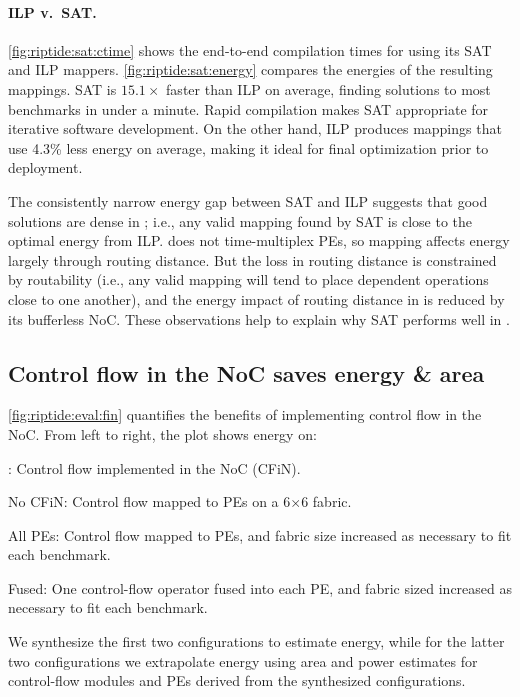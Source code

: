 \figRipTideSATResults
\paragraph{ILP v.\ SAT.}
\autoref{fig:riptide:sat:ctime} shows the end-to-end compilation times for \riptide using its SAT and ILP mappers.
% 
\autoref{fig:riptide:sat:energy} compares the energies of the resulting mappings.
% 
SAT is $15.1\times$ faster than ILP on average, finding solutions to most benchmarks in under a minute.
% 
Rapid compilation makes SAT appropriate for iterative software development.
% 
On the other hand, ILP produces mappings that use 4.3\% less energy on average, making it ideal for final optimization prior to deployment.

The consistently narrow energy gap between SAT and ILP suggests that good solutions are dense in \riptide;
i.e., any valid mapping found by SAT is close to the optimal energy from ILP.
%
\riptide does not time-multiplex PEs, so mapping affects energy largely through routing distance.
%
But the loss in routing distance is constrained by routability
(i.e., any valid mapping will tend to place dependent operations close to one another),
and the energy impact of routing distance in \riptide is reduced by its bufferless NoC.
%
These observations help to explain why SAT performs well in \riptide.

\figRipTideFINResults
\subsection{Control flow in the NoC saves energy \& area}
\label{riptide:eval:fin}
\autoref{fig:riptide:eval:fin} quantifies the benefits of implementing control flow in the NoC.
% 
From left to right, the plot shows energy on:
\begin{compactitem}
\item \riptide: Control flow implemented in the NoC (CFiN).
\item No CFiN: Control flow mapped to PEs on a 6$\times$6 fabric.
\item All PEs: Control flow mapped to PEs, and fabric size increased as necessary to fit each benchmark.
\item Fused: One control-flow operator fused into each PE, and fabric sized increased as necessary to fit each benchmark.
\end{compactitem}
% 
We synthesize the first two configurations to estimate energy, while for the latter two configurations we extrapolate energy using area and power estimates for control-flow modules and PEs derived from the synthesized configurations.
 
